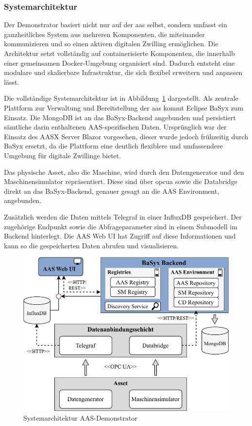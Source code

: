 \subsubsection{Systemarchitektur}
Der Demonstrator basiert nicht nur auf der \acs{aas} selbst, sondern umfasst ein ganzheitliches System aus mehreren Komponenten, die miteinander kommunizieren und so einen aktiven digitalen Zwilling ermöglichen.
Die Architektur setzt vollständig auf containerisierte Komponenten, die innerhalb einer gemeinsamen Docker-Umgebung organisiert sind.
Dadurch entsteht eine modulare und skalierbare Infrastruktur, die sich flexibel erweitern und anpassen lässt.

Die vollständige Systemarchitektur ist in Abbildung~\ref{fig:Systemarchitektur} dargestellt.
Als zentrale Plattform zur Verwaltung und Bereitstellung der \acs{aas} kommt Eclipse BaSyx zum Einsatz.
Die MongoDB ist an das BaSyx-Backend angebunden und persistiert sämtliche darin enthaltenen AAS-spezifischen Daten.
Ursprünglich war der Einsatz des AASX Server Blazor vorgesehen, dieser wurde jedoch frühzeitig durch BaSyx ersetzt, da die Plattform eine deutlich flexiblere und umfassendere Umgebung für digitale Zwillinge bietet.

Das physische Asset, also die Maschine, wird durch den Datengenerator und den Maschinensimulator repräsentiert.
Diese sind über \acs{opcua} sowie die Databridge direkt an das BaSyx-Backend, genauer gesagt an die AAS Environment, angebunden.

Zusätzlich werden die Daten mittels Telegraf in einer InfluxDB gespeichert.
Der zugehörige Endpunkt sowie die Abfrageparameter sind in einem Submodell im Backend hinterlegt.
Die AAS Web UI hat Zugriff auf diese Informationen und kann so die gespeicherten Daten abrufen und visualisieren.

\begin{figure}[htbp]
    \centering
        \includegraphics[width=1\textwidth]{Bilder/Ergebnisse/DynamischeDaten/Architektur.pdf}
    \caption{Systemarchitektur AAS-Demonstrator}
    \label{fig:Systemarchitektur}
\end{figure}

